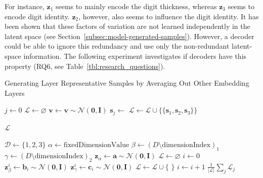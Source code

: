 For instance, $\bm{z}_1$ seems to mainly encode the digit thickness, whereas $\bm{z}_3$ seems to encode digit identity.
$\bm{z}_2$, however, also seems to influence the digit identity.
It has been shown that these factors of variation are not learned independently in the latent space (see Section~\ref{subsec:model-generated-samples}).
However, a decoder could be able to ignore this redundancy and use only the non-redundant latent-space information.
The following experiment investigates if decoders have this property (RQ6, see Table~\ref{tbl:research_questions}).
\begin{breakablealgorithm}
    \caption{Generating Layer Representative Samples by Averaging Out Other Embedding Layers}\label{alg:layer_representative_samples}
    \begin{algorithmic}[1]
            \State $j \gets 0$
            \State $\mathcal{L}\gets \varnothing$
                \State $\bm{v} \gets \bm{v} \sim \mathcal{N}(\bm{0}, \bm{I})$\label{line:fixing_v}
                    \State $\bm{s}_j \gets$ 
                \EndFor
                \State $\mathcal{L} \gets \mathcal{L} \cup \{\{\bm{s}_1, \bm{s}_2, \bm{s}_3\}\}$

            \EndWhile
            \State \Return $\mathcal{L}$
        \EndFunction

            \State $\mathcal{D} \gets \{1,2,3\}$
            \State $\alpha \gets \text{fixedDimensionValue}$
            \State $\beta \gets (D \setminus \text{dimensionIndex})_1$
            \State $\gamma \gets (D \setminus \text{dimensionIndex})_2$
            \State $\bm{z}_{\alpha} \gets \bm{a} \sim \mathcal{N}(\bm{0}, \bm{I})$
            \State $\mathcal{L}\gets \varnothing$
            \State $i \gets 0$
                \State $\bm{z}_{\beta}^i \gets \bm{b}_i \sim \mathcal{N}(\bm{0}, \bm{I})$
                \State $\bm{z}_{\gamma}^i \gets \bm{c}_i \sim \mathcal{N}(\bm{0}, \bm{I})$
                \State $\mathcal{L} \gets \mathcal{L} \cup \{$  $\}$
                \State $i \gets i + 1$
            \EndWhile
            \State \Return $\frac{1}{|\mathcal{L}|}\sum_j \mathcal{L}_j$
        \EndFunction
    \end{algorithmic}
\end{breakablealgorithm}

